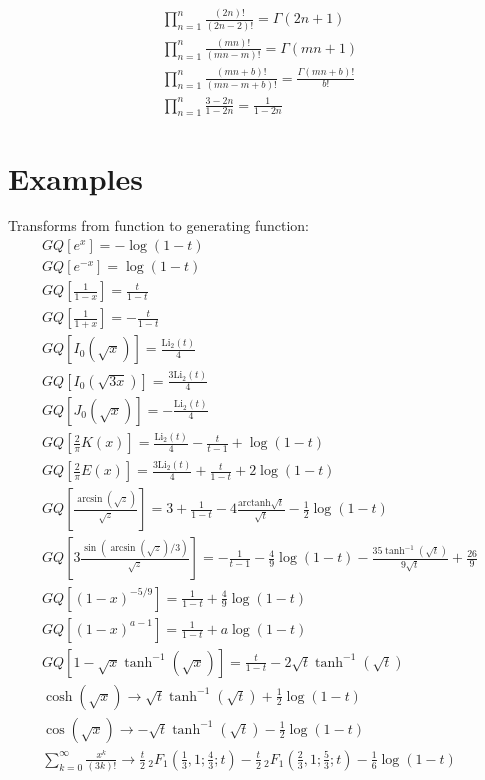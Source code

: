 \documentclass{article}
\begin{document}
\begin{align}
\prod_{n=1}^n \frac{(2n)!}{(2n-2)!} = \Gamma(2n+1) \\
\prod_{n=1}^n \frac{(mn)!}{(mn-m)!} = \Gamma(mn+1) \\
\prod_{n=1}^n \frac{(mn + b)!}{(mn-m+b)!} = \frac{\Gamma(mn+b)!}{b!} \\
\prod_{n=1}^n \frac{3-2n}{1-2n} = \frac{1}{1-2n}
\end{align}


\section{Examples}
Transforms from function to generating function:
\begin{align}
G Q[e^x] = -\log(1-t) \\
G Q[e^{-x}] = \log(1-t) \\
GQ\left[\frac{1}{1-x}\right] = \frac{t}{1-t} \\
GQ\left[\frac{1}{1+x}\right] = -\frac{t}{1-t} \\
GQ\left[I_0(\sqrt{x})\right] = \frac{\text{Li}_2(t)}{4} \\
GQ\left[I_0(\sqrt{3x})\right] = \frac{3\text{Li}_2(t)}{4} \\
GQ\left[J_0(\sqrt{x})\right] = -\frac{\text{Li}_2(t)}{4} \\
GQ[ \frac{2}{\pi} K(x)] = \frac{\text{Li}_2(t)}{4}-\frac{t}{t-1}+\log (1-t) \\
GQ[ \frac{2}{\pi} E(x)] = \frac{3\text{Li}_2(t)}{4}+\frac{t}{1-t}+2\log (1-t) \\
GQ[ \frac{\arcsin(\sqrt{z})}{\sqrt{z}}] = 3 + \frac{1}{1-t} - 4 \frac{\mathrm{arctanh}{\sqrt{t}}}{\sqrt{t}} - \frac{1}{2}\log(1-t) \\
GQ[ 3\frac{\sin(\arcsin(\sqrt{z})/3)}{\sqrt{z}}] = -\frac{1}{t-1}-\frac{4}{9} \log (1-t)-\frac{35 \tanh
    ^{-1}\left(\sqrt{t}\right)}{9 \sqrt{t}}+\frac{26}{9} \\
GQ\left[(1-x)^{-5/9}\right] = \frac{1}{1-t} + \frac{4}{9} \log(1-t) \\
GQ\left[(1-x)^{a-1}\right] = \frac{1}{1-t} + a \log(1-t)\\
GQ\left[1-\sqrt{x}\tanh^{-1}(\sqrt{x})\right] = \frac{t}{1-t} - 2 \sqrt{t} \tanh^{-1}(\sqrt{t}) \\
\cosh(\sqrt{x}) \to \sqrt{t} \tanh^{-1}(\sqrt{t}) + \frac{1}{2}\log(1-t) \\
\cos(\sqrt{x}) \to -\sqrt{t} \tanh^{-1}(\sqrt{t}) - \frac{1}{2}\log(1-t) \\
\sum_{k=0}^\infty \frac{x^k}{(3k)!} \to \frac{t}{2} \, _2F_1\left(\frac{1}{3},1;\frac{4}{3};t\right)-\frac{t}{2}
    \, _2F_1\left(\frac{2}{3},1;\frac{5}{3};t\right)-\frac{1}{6} \log (1-t)
\end{align}
\end{document}
